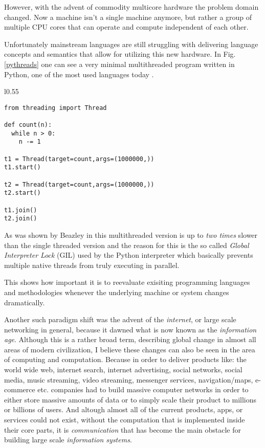 However, with the advent of commodity multicore hardware
\cite{core2duo} the problem domain changed. Now a machine isn't
a single machine anymore, but rather a group of multiple CPU cores
that can operate and compute independent of each other.

Unfortunately mainstream languages are still struggling with delivering
language concepts and semantics that allow for utilizing this new
hardware. In Fig.\ref{pythreads} one can see a very minimal multithreaded
program written in Python, one of the most used languages today
\cite{langrank}.


\begin{wrapfigure}{l}{0.55\textwidth}
  \vspace{-10pt}
  \begin{center}
    \begin{lstlisting}
from threading import Thread

def count(n):
  while n > 0:
    n -= 1

t1 = Thread(target=count,args=(1000000,))
t1.start()

t2 = Thread(target=count,args=(1000000,))
t2.start()

t1.join()
t2.join()
    \end{lstlisting}
  \end{center}
  \vspace{-20pt}
  \caption{Python multithreading example}
  \label{pythreads}
\end{wrapfigure}

As was shown by Beazley in \cite{pygil} this multithreaded version is up to
\textit{two times} slower than the single threaded version and the
reason for this is the so called \textit{Global Interpreter Lock}
(GIL) used by the Python interpreter which basically prevents multiple
native threads from truly executing in parallel.

This shows how important it is to reevaluate exisiting programming
languages and methodologies whenever the underlying machine or system
changes dramatically.
\newline

Another such paradigm shift was the advent of
the \textit{internet}, or large scale networking in general, because it
dawned what is now known as the \textit{information age}. Although this
is a rather broad term, describing global change in almost all areas of
modern civilization, I believe these changes can also be seen in the area
of computing and computation. Because in order to deliver products
like: the world wide web, internet search, internet advertising,
social networks, social media, music streaming,
video streaming, messenger services, navigation/maps, e-commerce etc.
companies had to build massive computer networks in order to either store
massive amounts of data or to simply scale their
product to millions or billions of users.
And altough almost all of the current products, apps, or services
could not exist, without the computation that is implemented inside
their core parts, it is \textit{communication} that has become the
main obstacle for building large scale \textit{information systems}.
